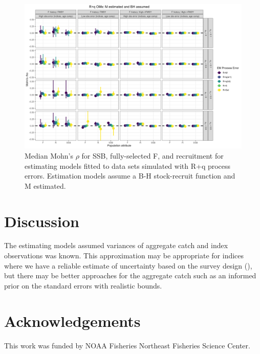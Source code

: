 \documentclass[
  12pt,
]{article}
\newlength{\cslhangindent}
\newlength{\cslentryspacingunit} %
\newenvironment{CSLReferences}[2] %
 {%
  \setlength{\parindent}{0pt}
  \ifodd #1
  \let\oldpar\par
  \def\par{\hangindent=\cslhangindent\oldpar}
  \fi
  \setlength{\parskip}{#2\cslentryspacingunit}
 }%
 {}
\begin{document}
\begin{landscape}
\begin{figure}
\caption{Median Mohn's $\rho$ for SSB, fully-selected F, and recruitment for estimating models fitted to data sets simulated with R+q process errors.  Estimation models assume a B-H stock-recruit function and M estimated.}\label{q_om_em_BH_ME_mohns_rho}
\begin{center}
\includegraphics[width = \textwidth]{q_om_mohns_rho_BH_ME.png}
\end{center}
\end{figure}
\end{landscape}

\hypertarget{discussion}{%
\section*{Discussion}\label{discussion}}

The estimating models assumed variances of aggregate catch and index
observations was known. This approximation may be appropriate for
indices where we have a reliable estimate of uncertainty based on the
survey design (), but there may be better approaches for the aggregate
catch such as an informed prior on the standard errors with realistic
bounds.

\hypertarget{acknowledgements}{%
\section*{Acknowledgements}\label{acknowledgements}}

This work was funded by NOAA Fisheries Northeast Fisheries Science
Center.

\pagebreak



\hypertarget{refs}{}
\begin{CSLReferences}{0}{0}
\end{CSLReferences}

\pagebreak
\end{document}
